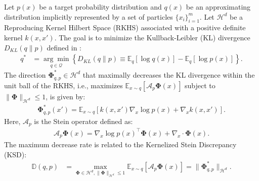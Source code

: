 \begin{theorem}
\label{thm:svgd}
Let $p(x)$ be a target probability distribution and $q(x)$ be an approximating distribution implicitly represented by a set of particles $\{x_i\}_{i=1}^m$. Let ${\mathcal{H}}^d$ be a Reproducing Kernel Hilbert Space (RKHS) associated with a positive definite kernel $k(x, x')$. The goal is to minimize the Kullback-Leibler (KL) divergence $D_{KL}(q \| p)$ defined in :
\begin{equation}
\begin{aligned}
 q^{*}&=\underset{q \in {\mathcal{Q}}}{\arg\min}\left\{D_{KL}(q \| p) \equiv {{\mathbb{E}}}_{q}[\log q(x)]-{{\mathbb{E}}}_{q}[\log {p}(x)] \right\}.
 \label{eq:kl_min_prelim}
\end{aligned}
\end{equation}
The direction ${\boldsymbol{\Phi}}_{q, p}^{*} \in {\mathcal{H}}^d$ that maximally decreases the KL divergence within the unit ball of the RKHS, i.e., maximizes ${{\mathbb{E}}}_{x \sim q}\left[{\mathcal{A}}_{p} {\boldsymbol{\Phi}}(x)\right]$ subject to $\|{\boldsymbol{\Phi}}\|_{{\mathcal{H}}^d} \leq 1$, is given by:
\begin{equation}
\begin{aligned}
{\boldsymbol{\Phi}}_{q, p}^{*}(x') = {{\mathbb{E}}}_{x \sim q}\left[k(x, x') \nabla_{x} \log p(x) + \nabla_{x} k(x, x')\right].
\label{eq:phi_solution_prelim}
\end{aligned}
\end{equation}
Here, ${\mathcal{A}}_{p}$ is the Stein operator defined as:
\begin{equation}
\begin{aligned}
{\mathcal{A}}_{p} {\boldsymbol{\Phi}}(x) = \nabla_{x} \log p(x)^{\top} {\boldsymbol{\Phi}}(x) + \nabla_{x} \cdot {\boldsymbol{\Phi}}(x).
\label{eq:stein_operator}
\end{aligned}
\end{equation}
The maximum decrease rate is related to the Kernelized Stein Discrepancy (KSD):
\begin{equation}
\begin{aligned}
{{\mathbb{D}}}(q,p)&=\max_{{\boldsymbol{\Phi}}\in {\mathcal{H}}^d, \|{\boldsymbol{\Phi}}\|_{{\mathcal{H}}^d} \leq 1}{{\mathbb{E}}}_{x \sim q}\left[{\mathcal{A}}_{p} {\boldsymbol{\Phi}}(x)\right] = \|{\boldsymbol{\Phi}}_{q, p}^{*}\|_{{\mathcal{H}}^d}.
\label{eq:ksd_prelim}
\end{aligned}
\end{equation}
\end{theorem}

